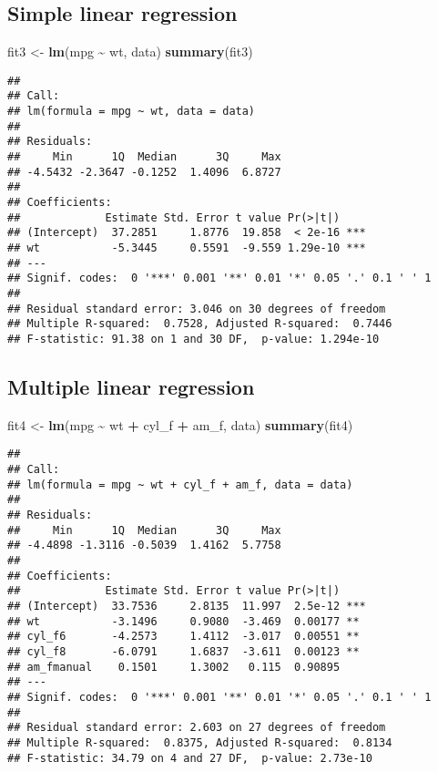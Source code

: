 \documentclass[
  a4paper,
]{article}
\newenvironment{Shaded}{\begin{snugshade}}{\end{snugshade}}
\newcommand{\FunctionTok}[1]{\textcolor[rgb]{0.13,0.29,0.53}{\textbf{#1}}}
\newcommand{\NormalTok}[1]{#1}
\newcommand{\OtherTok}[1]{\textcolor[rgb]{0.56,0.35,0.01}{#1}}
\newcommand{\SpecialCharTok}[1]{\textcolor[rgb]{0.81,0.36,0.00}{\textbf{#1}}}
\begin{document}
\subsection{Simple linear regression}\label{simple-linear-regression}

\begin{Shaded}
\begin{Highlighting}[]
\NormalTok{fit3 }\OtherTok{\textless{}{-}} \FunctionTok{lm}\NormalTok{(mpg }\SpecialCharTok{\textasciitilde{}}\NormalTok{ wt, data)}
\FunctionTok{summary}\NormalTok{(fit3)}
\end{Highlighting}
\end{Shaded}

\begin{verbatim}
## 
## Call:
## lm(formula = mpg ~ wt, data = data)
## 
## Residuals:
##     Min      1Q  Median      3Q     Max 
## -4.5432 -2.3647 -0.1252  1.4096  6.8727 
## 
## Coefficients:
##             Estimate Std. Error t value Pr(>|t|)    
## (Intercept)  37.2851     1.8776  19.858  < 2e-16 ***
## wt           -5.3445     0.5591  -9.559 1.29e-10 ***
## ---
## Signif. codes:  0 '***' 0.001 '**' 0.01 '*' 0.05 '.' 0.1 ' ' 1
## 
## Residual standard error: 3.046 on 30 degrees of freedom
## Multiple R-squared:  0.7528, Adjusted R-squared:  0.7446 
## F-statistic: 91.38 on 1 and 30 DF,  p-value: 1.294e-10
\end{verbatim}

\subsection{Multiple linear
regression}\label{multiple-linear-regression}

\begin{Shaded}
\begin{Highlighting}[]
\NormalTok{fit4 }\OtherTok{\textless{}{-}} \FunctionTok{lm}\NormalTok{(mpg }\SpecialCharTok{\textasciitilde{}}\NormalTok{ wt }\SpecialCharTok{+}\NormalTok{ cyl\_f }\SpecialCharTok{+}\NormalTok{ am\_f, data)}
\FunctionTok{summary}\NormalTok{(fit4)}
\end{Highlighting}
\end{Shaded}

\begin{verbatim}
## 
## Call:
## lm(formula = mpg ~ wt + cyl_f + am_f, data = data)
## 
## Residuals:
##     Min      1Q  Median      3Q     Max 
## -4.4898 -1.3116 -0.5039  1.4162  5.7758 
## 
## Coefficients:
##             Estimate Std. Error t value Pr(>|t|)    
## (Intercept)  33.7536     2.8135  11.997  2.5e-12 ***
## wt           -3.1496     0.9080  -3.469  0.00177 ** 
## cyl_f6       -4.2573     1.4112  -3.017  0.00551 ** 
## cyl_f8       -6.0791     1.6837  -3.611  0.00123 ** 
## am_fmanual    0.1501     1.3002   0.115  0.90895    
## ---
## Signif. codes:  0 '***' 0.001 '**' 0.01 '*' 0.05 '.' 0.1 ' ' 1
## 
## Residual standard error: 2.603 on 27 degrees of freedom
## Multiple R-squared:  0.8375, Adjusted R-squared:  0.8134 
## F-statistic: 34.79 on 4 and 27 DF,  p-value: 2.73e-10
\end{verbatim}
\end{document}
